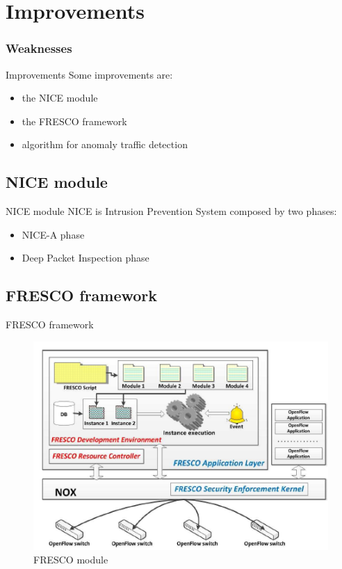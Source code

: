 \section{Improvements}
\frame
{
\frametitle{Weaknesses}
\tableofcontents[currentsection]
\addtocounter{framenumber}{-1}
}

\begin{frame}{Improvements}
Some improvements are:
\begin{itemize}
\item<2-> the NICE module
\item<3-> the FRESCO framework
\item<4-> algorithm for anomaly traffic detection
\end{itemize}
\end{frame}

\subsection{NICE module}
\begin{frame}{NICE module}
NICE is Intrusion Prevention System composed by two phases:
\begin{itemize}
\item<2-> NICE-A phase
\item<3-> Deep Packet Inspection phase
\end{itemize}
\end{frame}

\subsection{FRESCO framework}
\begin{frame}{FRESCO framework}
\begin{figure}
\includegraphics[scale=0.55]{Immagini/FrescoStructure.png}
\caption{FRESCO module}
\label{fig:FRESCO-module}
\end{figure}
\end{frame}

